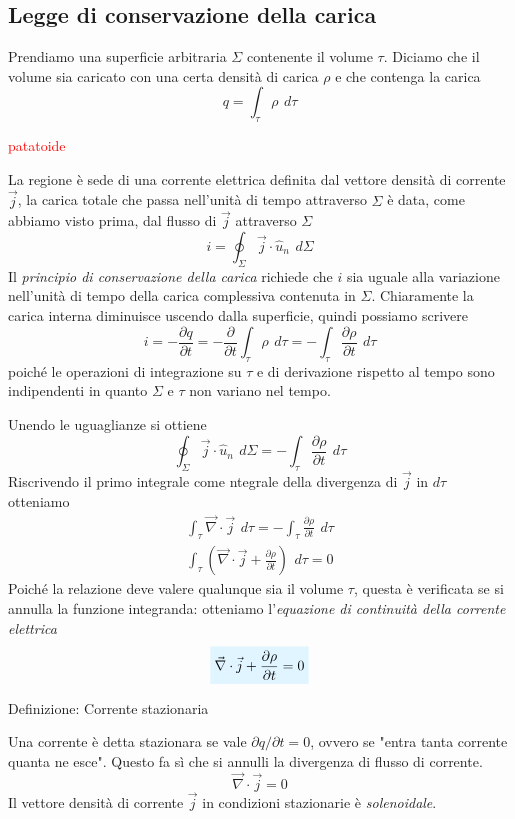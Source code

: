 \documentclass[x11names]{report}
\newcommand{\definizione}[2]{
	\begin{center}
		\fboxsep11pt
		\colorbox{myblue}{\begin{minipage}{5.75in}
				\begin{blues}{Definizione: #1}
					#2
				\end{blues}
		\end{minipage}}
	\end{center}
}
\newcommand{\viola}[1]{%
	\colorbox{myblue}{$\displaystyle #1$}
}
\begin{document}
\subsection{Legge di conservazione della carica}
Prendiamo una superficie arbitraria \(\Sigma\) contenente il volume \(\tau\). Diciamo che il volume sia caricato con una certa densità di carica \(\rho\) e che contenga la carica
\[
q = \int_\tau \rho \,\ d\tau
\]
\begin{center}
	\textcolor{red}{patatoide}
\end{center}
La regione è sede di una corrente elettrica definita dal vettore densità di corrente \(\vec{j}\), la carica totale che passa nell'unità di tempo attraverso \(\Sigma\) è data, come abbiamo visto prima, dal flusso di \(\vec{j}\) attraverso \(\Sigma\)
\[
i = \oint_{\Sigma} \vec{j}\cdot \hat{u}_n \,\ d\Sigma
\]
Il \textit{principio di conservazione della carica} richiede che \(i\) sia uguale alla variazione nell'unità di tempo della carica complessiva contenuta in \(\Sigma\). Chiaramente la carica interna diminuisce uscendo dalla superficie, quindi possiamo scrivere
\[
i = - \frac{\partial q}{\partial t} = -\frac{\partial}{\partial t}\int_\tau \rho \,\ d\tau = -\int_\tau \frac{\partial\rho}{\partial t} \,\ d\tau
\]
poiché le operazioni di integrazione su \(\tau\) e di derivazione rispetto al tempo sono indipendenti in quanto \(\Sigma\) e \(\tau\) non variano nel tempo.

Unendo le uguaglianze si ottiene
\[
\oint_{\Sigma} \vec{j}\cdot \hat{u}_n \,\ d\Sigma = -\int_\tau \frac{\partial\rho}{\partial t} \,\ d\tau
\]
Riscrivendo il primo integrale come ntegrale della divergenza di \(\vec{j}\) in \(d\tau\) otteniamo
\begin{gather}
	\int_\tau \vec{\nabla} \cdot \vec{j} \,\ d\tau = - \int_\tau \frac{\partial\rho}{\partial t} \,\ d\tau \\
	\int_\tau \left(\vec{\nabla} \cdot \vec{j} + \frac{\partial\rho}{\partial t}\right)\,\ d\tau = 0
\end{gather}
Poiché la relazione deve valere qualunque sia il volume \(\tau\), questa è verificata se si annulla la funzione integranda: otteniamo l'\textit{equazione di continuità della corrente elettrica}
\begin{equation}
	\label{cont corr}
	\viola{\vec{\nabla} \cdot \vec{j} + \frac{\partial\rho}{\partial t} = 0}
\end{equation}
\definizione{Corrente stazionaria}{
Una corrente è detta stazionara se vale \(\partial q/\partial t = 0\), ovvero se "entra tanta corrente quanta ne esce". Questo fa sì che si annulli la divergenza di flusso di corrente.
\begin{equation}
	\vec{\nabla} \cdot \vec{j} = 0
\end{equation}
Il vettore densità di corrente \(\vec{j}\) in condizioni stazionarie è \textit{solenoidale}.
}
\end{document}
